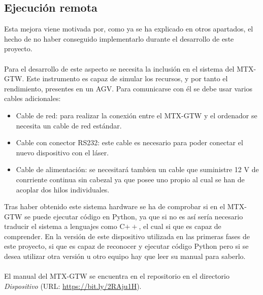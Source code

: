 \subsection{Ejecución remota}
Esta mejora viene motivada por, como ya se ha explicado en otros apartados, el hecho de no haber conseguido implementarlo durante el desarrollo de este proyecto.\\
\\
Para el desarrollo de este aspecto se necesita la inclusión en el sistema del MTX-GTW. Este instrumento es capaz de simular los recursos, y por tanto el rendimiento, presentes en un AGV. Para comunicarse con él se debe usar varios cables adicionales:
\begin{itemize}
	\item Cable de red: para realizar la conexión entre el MTX-GTW y el ordenador se necesita un cable de red estándar.
	\item Cable con conector RS232: este cable es necesario para poder conectar el nuevo dispositivo con el láser.
	\item Cable de alimentación: se necesitará tambien un cable que suministre 12 V de conrriente continua sin cabezal ya que posee uno propio al cual se han de acoplar dos hilos individuales.
\end{itemize}
Tras haber obtenido este sistema hardware se ha de comprobar si en el MTX-GTW se puede ejecutar código en Python, ya que si no es así sería necesario traducir el sistema a lenguajes como C$++$, el cual si que es capaz de comprender. En la versión de este dispositivo utilizada en las primeras fases de este proyecto, si que es capaz de reconocer y ejecutar código Python pero si se desea utilizar otra versión u otro equipo hay que leer su manual para saberlo.\\
\\
El manual del MTX-GTW se encuentra en el repositorio en el directorio \textit{Dispositivo} (URL: \url{https://bit.ly/2RAju1H}).

